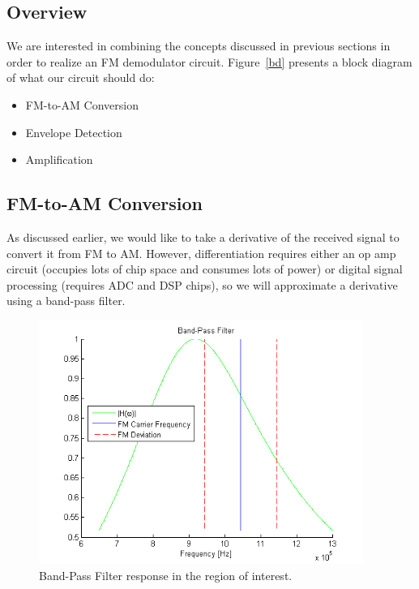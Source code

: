 \documentclass[11pt]{article}
\begin{document}
    \subsection{Overview}
    We are interested in combining the concepts discussed in previous sections in order to realize an FM demodulator circuit. Figure~\ref{bd} presents a block diagram of what our circuit should do:
    \begin{itemize}
        \item FM-to-AM Conversion
        \item Envelope Detection
        \item Amplification
    \end{itemize}

    \subsection{FM-to-AM Conversion}
    As discussed earlier, we would like to take a derivative of the received signal to convert it from FM to AM. However, differentiation requires either an op amp circuit (occupies lots of chip space and consumes lots of power) or digital signal processing (requires ADC and DSP chips), so we will approximate a derivative using a band-pass filter.
    
    \begin{figure}[H]
        \centering
            \includegraphics[width = 400px]{demod_matlab.png}
        \caption{Band-Pass Filter response in the region of interest.}
        \label{bpfm}
    \end{figure}
    
\end{document}
